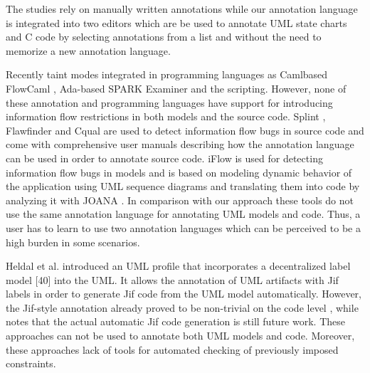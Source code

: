  The studies rely on manually
written annotations while our annotation language is integrated
into two editors which are be used to annotate UML state
charts and C code by selecting annotations from a list and
without the need to memorize a new annotation language.

Recently taint modes integrated in programming languages as Camlbased FlowCaml \cite{ref_32_simonet:report}, Ada-based SPARK Examiner \cite{ref_31_chapman:enforcing} and the scripting. However, none of these annotation and programming languages have support for introducing information flow
restrictions in both models and the source code.
Splint \cite{ref_30_david:splint}, Flawfinder \cite{ref_29_wheeler:flawfinder} and Cqual \cite{ref_28_umesh:cqual} are used to
detect information flow bugs in source code and come with
comprehensive user manuals describing how the annotation
language can be used in order to annotate source code.
iFlow \cite{ref_27_iflow:kuzman} is used for detecting information flow bugs in
models and is based on modeling dynamic behavior of the
application using UML sequence diagrams and translating
them into code by analyzing it with JOANA \cite{ref_26_kit:joana}. In comparison with our approach these tools do not use the same
annotation language for annotating UML models and code.
Thus, a user has to learn to use two annotation languages
which can be perceived to be a high burden in some scenarios.


 Heldal et al. \cite{ref_25_heldal:bridging,ref_23_heldal:supporting} introduced an
UML profile that incorporates a decentralized label model [40]
into the UML. It allows the annotation of UML artifacts with
Jif \cite{ref_24_myers:descentrelized} labels in order to generate Jif code from the UML
model automatically. However, the Jif-style annotation already
proved to be non-trivial on the code level \cite{ref_22_preibusch2011information}, while \cite{ref_23_heldal:supporting}
notes that the actual automatic Jif code generation is still future
work. These approaches can not be used to annotate both UML
models and code. Moreover, these approaches lack of tools for
automated checking of previously imposed constraints.